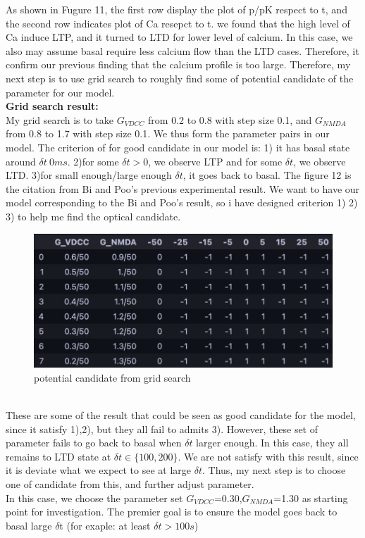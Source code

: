 \documentclass{article}
\begin{document}
As shown in Fugure 11, the first row display the plot of p/pK respect to t, and the second row indicates plot of Ca resepct to t. we found that the high level of Ca induce LTP, and it turned to LTD for lower level of calcium. In this case, we also may assume basal require less calcium flow than the LTD cases. Therefore, it confirm our previous finding that the calcium profile is too large. Therefore, my next step is to use grid search to roughly find some of potential candidate of the parameter for our model.\\
\linebreak
\textbf{Grid search result:}\\

My grid search is to take $G_{VDCC}$ from 0.2 to 0.8 with step size 0.1, and $G_{NMDA}$ from 0.8 to 1.7 with step size 0.1. We thus form the parameter pairs in our model. The criterion of for good candidate in our model is: 1) it has basal state around $\delta t~0ms$. 2)for some $\delta t>0$, we observe LTP and for some $\delta t $, we observe LTD. 3)for small enough/large enough $\delta t$, it goes back to basal. The figure 12 is the citation from Bi and Poo's previous experimental result. We want to have our model corresponding to the Bi and Poo's result, so i have designed criterion 1) 2) 3) to help me find the optical candidate.
\begin{figure}[ht]
    \centering
    \includegraphics[width=.7\linewidth]{4.png}
    \caption{potential candidate from grid search}
    \label{fig:fig4}
\end{figure}\\
These are some of the result that could be seen as good candidate for the model, since it satisfy 1),2), but they all fail to admits 3). However, these set of parameter fails to go back to basal when $\delta t$ larger enough. In this case, they all remains to LTD state at $\delta t\in \{100,200\}$. We are not satisfy with this result, since it is deviate what we expect to see at large $\delta t$. Thus, my next step is to choose one of candidate from this, and further adjust parameter. \\In this case, we choose the parameter set $G_{VDCC}$=0.30,$G_{NMDA}$=1.30 as starting point for investigation. The premier goal is to ensure the model goes back to basal large $\delta $t (for exaple: at least $\delta t>100s$)
\end{document}
